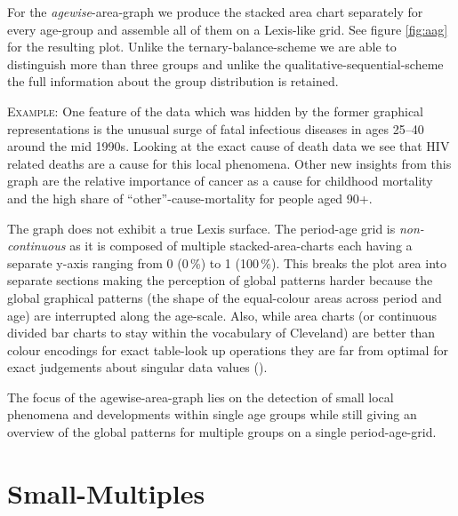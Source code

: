 \documentclass{scrartcl}
\begin{document}
For the \emph{agewise}-area-graph we produce the stacked area chart separately for every age-group and assemble all of them on a Lexis-like grid. See figure \ref{fig:aag} for the resulting plot. Unlike the ternary-balance-scheme we are able to distinguish more than three groups and unlike the qualitative-sequential-scheme the full information about the group distribution is retained.

\textsc{Example:} One feature of the data which was hidden by the former graphical representations is the unusual surge of fatal infectious diseases in ages 25--40 around the mid 1990s. Looking at the exact cause of death data we see that HIV related deaths are a cause for this local phenomena. Other new insights from this graph are the relative importance of cancer as a cause for childhood mortality and the high share of \enquote{other}-cause-mortality for people aged 90+.

The graph does not exhibit a true Lexis surface. The period-age grid is \emph{non-continuous} as it is composed of multiple stacked-area-charts each having a separate y-axis ranging from 0 (0\,\%) to 1 (100\,\%). This breaks the plot area into separate sections making the perception of global patterns harder because the global graphical patterns (the shape of the equal-colour areas across period and age) are interrupted along the age-scale. Also, while area charts (or continuous divided bar charts to stay within the vocabulary of Cleveland) are better than colour encodings for exact table-look up operations they are far from optimal for exact judgements about singular data values (\cite{Cleveland1994}).

The focus of the agewise-area-graph lies on the detection of small local phenomena and developments within single age groups while still giving an overview of the global patterns for multiple groups on a single period-age-grid.

\clearpage

\section{Small-Multiples} %
\label{sec:sm}
\end{document}
